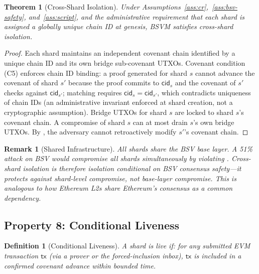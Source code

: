 \documentclass[11pt,a4paper]{article}
\newtheorem{definition}{Definition}[section]
\newtheorem{theorem}{Theorem}[section]
\newtheorem{remark}{Remark}[section]
\begin{document}
\begin{theorem}[Cross-Shard Isolation]\label{thm:shard-iso}
Under Assumptions~\ref{ass:cr},~\ref{ass:bsv-safety}, and~\ref{ass:script}, and the administrative requirement that each shard is assigned a globally unique chain ID at genesis, BSVM satisfies cross-shard isolation.
\end{theorem}

\begin{proof}
Each shard maintains an independent covenant chain identified by a unique chain ID and its own bridge sub-covenant UTXOs. Covenant condition (C5) enforces chain ID binding: a proof generated for shard $s$ cannot advance the covenant of shard $s'$ because the proof commits to $\mathsf{cid}_s$ and the covenant of $s'$ checks against $\mathsf{cid}_{s'}$; matching requires $\mathsf{cid}_s = \mathsf{cid}_{s'}$, which contradicts uniqueness of chain IDs (an administrative invariant enforced at shard creation, not a cryptographic assumption). Bridge UTXOs for shard $s$ are locked to shard $s$'s covenant chain. A compromise of shard $s$ can at most drain $s$'s own bridge UTXOs. By , the adversary cannot retroactively modify $s'$'s covenant chain. \qedhere
\end{proof}

\begin{remark}[Shared Infrastructure]\label{rem:shared-infra}
All shards share the BSV base layer. A 51\% attack on BSV would compromise \emph{all} shards simultaneously by violating . Cross-shard isolation is therefore isolation \emph{conditional on BSV consensus safety}---it protects against shard-level compromise, not base-layer compromise. This is analogous to how Ethereum L2s share Ethereum's consensus as a common dependency.
\end{remark}


\subsection{Property 8: Conditional Liveness}\label{subsec:liveness}

\begin{definition}[Conditional Liveness]\label{def:shard-live}
A shard is \emph{live} if: for any submitted EVM transaction $\mathsf{tx}$ (via a prover or the forced-inclusion inbox), $\mathsf{tx}$ is included in a confirmed covenant advance within bounded time.
\end{definition}
\end{document}
